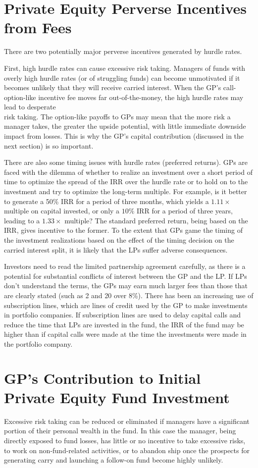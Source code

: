 \documentclass[11pt]{article}
\begin{document}
\section*{Private Equity Perverse Incentives from Fees}
There are two potentially major perverse incentives generated by hurdle rates.

First, high hurdle rates can cause excessive risk taking. Managers of funds with overly high hurdle rates (or of struggling funds) can become unmotivated if it becomes unlikely that they will receive carried interest. When the GP's call-option-like incentive fee moves far out-of-the-money, the high hurdle rates may lead to desperate\\
risk taking. The option-like payoffs to GPs may mean that the more risk a manager takes, the greater the upside potential, with little immediate downside impact from losses. This is why the GP's capital contribution (discussed in the next section) is so important.

There are also some timing issues with hurdle rates (preferred returns). GPs are faced with the dilemma of whether to realize an investment over a short period of time to optimize the spread of the IRR over the hurdle rate or to hold on to the investment and try to optimize the long-term multiple. For example, is it better to generate a 50\% IRR for a period of three months, which yields a $1.11 \times$ multiple on capital invested, or only a $10 \%$ IRR for a period of three years, leading to a $1.33 \times$ multiple? The standard preferred return, being based on the IRR, gives incentive to the former. To the extent that GPs game the timing of the investment realizations based on the effect of the timing decision on the carried interest split, it is likely that the LPs suffer adverse consequences.

Investors need to read the limited partnership agreement carefully, as there is a potential for substantial conflicts of interest between the GP and the LP. If LPs don't understand the terms, the GPs may earn much larger fees than those that are clearly stated (such as 2 and 20 over 8\%). There has been an increasing use of subscription lines, which are lines of credit used by the GP to make investments in portfolio companies. If subscription lines are used to delay capital calls and reduce the time that LPs are invested in the fund, the IRR of the fund may be higher than if capital calls were made at the time the investments were made in the portfolio company.

\section*{GP's Contribution to Initial Private Equity Fund Investment}
Excessive risk taking can be reduced or eliminated if managers have a significant portion of their personal wealth in the fund. In this case the manager, being directly exposed to fund losses, has little or no incentive to take excessive risks, to work on non-fund-related activities, or to abandon ship once the prospects for generating carry and launching a follow-on fund become highly unlikely.
\end{document}
